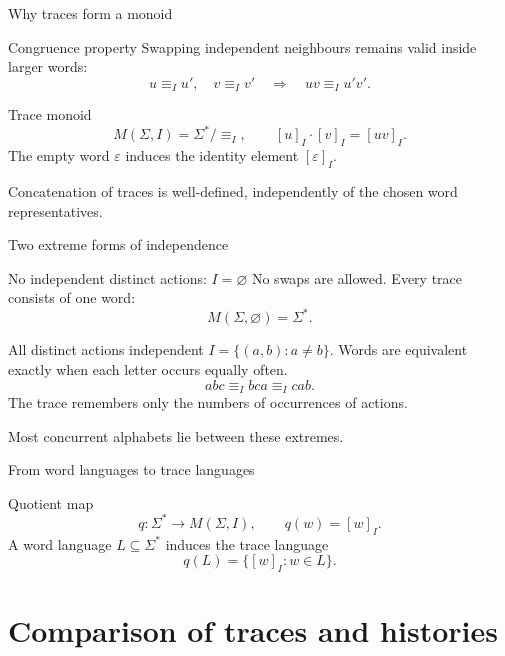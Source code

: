 \documentclass[t,11pt]{beamer}
\begin{document}
\begin{frame}{Why traces form a monoid}
  \begin{block}{Congruence property}
    Swapping independent neighbours remains valid inside larger words:
    \[
      u\equiv_Iu',\quad v\equiv_Iv'
      \quad\Longrightarrow\quad uv\equiv_Iu'v'.
    \]
  \end{block}
  \begin{block}{Trace monoid}
    \[
      M(\Sigma,I)=\Sigma^*/{\equiv_I},\qquad
      [u]_I\cdot[v]_I=[uv]_I.
    \]
    The empty word $\varepsilon$ induces the identity element $[\varepsilon]_I$.
  \end{block}
  \vspace{0.15cm}
  Concatenation of traces is well-defined, independently of the chosen word representatives.
\end{frame}

\begin{frame}{Two extreme forms of independence}
  \begin{block}{No independent distinct actions: $I=\varnothing$}
    No swaps are allowed. Every trace consists of one word:
    \[
      M(\Sigma,\varnothing)=\Sigma^*.
    \]
  \end{block}
  \begin{block}{All distinct actions independent}
    $I=\{(a,b):a\neq b\}$. Words are equivalent exactly when each letter occurs equally often.
    \[
      abc\equiv_I bca\equiv_I cab.
    \]
    The trace remembers only the numbers of occurrences of actions.
  \end{block}
  Most concurrent alphabets lie between these extremes.
\end{frame}

\begin{frame}{From word languages to trace languages}
  \begin{block}{Quotient map}
    \[
       q:\Sigma^*\longrightarrow M(\Sigma,I),\qquad q(w)=[w]_I.
    \]
    A word language $L\subseteq\Sigma^*$ induces the trace language
    \[
       q(L)=\{[w]_I:w\in L\}.
    \]
  \end{block}

\end{frame}

\section{Comparison of traces and histories}
\end{document}
